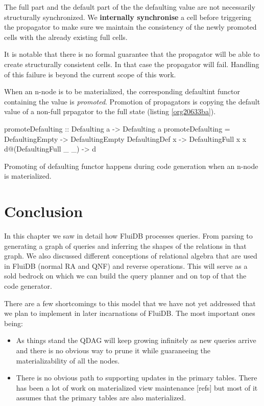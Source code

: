 The full part and the default part of the the defaulting value are not
necessarily structurally synchronized. We \textbf{internally synchronise} a
cell before triggering the propagator to make sure we maintain the
consistency of the newly promoted cells with the already existing full
cells.

It is notable that there is no formal guarantee that the propagator
will be able to create structurally consistent cells. In that case the
propagator will fail. Handling of this failure is beyond the current
scope of this work.

When an n-node is to be materialized, the corresponding defaultint
functor containing the value is \emph{promoted}.  Promotion of propagators
is copying the default value of a non-full prpagator to the full
state (listing \ref{org20633ba}).


\begin{code}
  \begin{haskellcode}
    promoteDefaulting :: Defaulting a -> Defaulting a
    promoteDefaulting = \case
      DefaultingEmpty        -> DefaultingEmpty
      DefaultingDef x        -> DefaultingFull x x
      d@(DefaultingFull _ _) -> d
  \end{haskellcode}
  \caption{\label{org20633ba}Promoting of defaulting functor happens during code generation when an n-node is materialized.}
\end{code}

\section{Conclusion}
\label{sec:org75594df}
In this chapter we saw in detail how FluiDB processes queries. From
parsing to generating a graph of queries and inferring the shapes of
the relations in that graph. We also discussed different conceptions
of relational algebra that are used in FluiDB (normal RA and QNF) and
reverse operations. This will serve as a sold bedrock on which we can
build the query planner and on top of that the code generator.

There are a few shortcomings to this model that we have not yet
addressed that we plan to implement in later incarnations of
FluiDB. The most important ones being:

\begin{itemize}
\item As things stand the QDAG will keep growing infinitely as new queries
  arrive and there is no obvious way to prune it while guaraneeing the
  materializability of all the nodes.
\item There is no obvious path to supporting updates in the primary
  tables. There has been a lot of work on materialized view
  maintenance [refs] but most of it assumes that the primary tables
  are also materialized.
\end{itemize}
